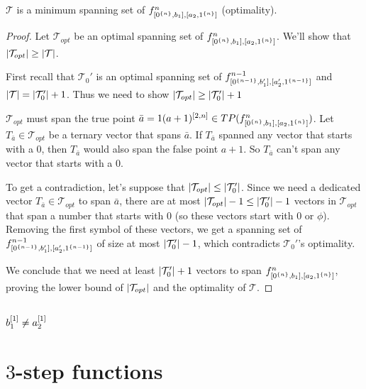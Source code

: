 \begin{theorem}
$\mathcal{T}$ is a minimum spanning set of
$f^{n}_{[0^{\{n\}}, b_1], [a_2, 1^{\{n\}}]}$ (optimality).
\end{theorem}

\begin{proof}
Let $\mathcal{T}_{opt}$ be an optimal spanning set of
$f^{n}_{[0^{\{n\}}, b_1], [a_2, 1^{\{n\}}]}$.
We'll show that
$\lvert\mathcal{T}_{opt}\rvert \geq \lvert\mathcal{T}\rvert$.

First recall that
$\mathcal{T}_0'$ is an optimal spanning set of
$f^{n-1}_{[0^{\{n-1\}}, b_1'], [a_2', 1^{\{n-1\}}]}$
and
$\lvert\mathcal{T}\rvert = \lvert\mathcal{T}_0'\rvert + 1$.
Thus we need to show
$\lvert\mathcal{T}_{opt}\rvert \geq \lvert\mathcal{T}_0'\rvert + 1$

$\mathcal{T}_{opt}$ must span the true point
$\bar{a} = 1 (a+1)^{[2, n]} \in TP(f^{n}_{[0^{\{n\}}, b_1], [a_2, 1^{\{n\}}]})$.
Let $T_{\bar{a}} \in \mathcal{T}_{opt}$
be a ternary vector that spans $\bar{a}$.
If $T_{\bar{a}}$ spanned any vector that starts with a $0$,
then $T_{\bar{a}}$ would also span the false point $a+1$.
So $T_{\bar{a}}$
can't span any vector that starts with a $0$.

To get a contradiction,
let's suppose that
$\lvert\mathcal{T}_{opt}\rvert \leq \lvert\mathcal{T}_0'\rvert$.
Since we need a dedicated vector
$T_{\bar{a}} \in \mathcal{T}_{opt}$ to span $\bar{a}$,
there are at most
$\lvert\mathcal{T}_{opt}\rvert - 1
\leq \lvert\mathcal{T}_0'\rvert - 1$
vectors in $\mathcal{T}_{opt}$ that span a number
that starts with $0$
(so these vectors start with $0$ or $\phi$).
Removing the first symbol of these vectors,
we get a spanning set of
$f^{n-1}_{[0^{\{n-1\}}, b_1'], [a_2', 1^{\{n-1\}}]}$
of size at most $\lvert\mathcal{T}_0'\rvert - 1$,
which contradicts $\mathcal{T}_0'$'s optimality.

We conclude that we need at least
$\lvert\mathcal{T}_0'\rvert + 1$ vectors to span
$f^{n}_{[0^{\{n\}}, b_1], [a_2, 1^{\{n\}}]}$,
proving the lower bound of
$\lvert\mathcal{T}_{opt}\rvert$
and the optimality of $\mathcal{T}$.
\end{proof}

\subsection{\texorpdfstring{$b_1^{[1]}
\neq a_2^{[1]}$}
{b1[1] != a2[1]}
}

\section{\texorpdfstring{$3$}{3}-step functions}

